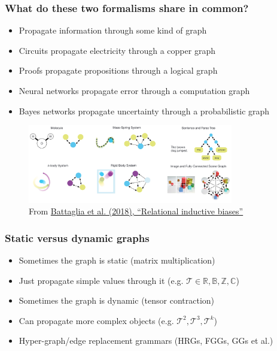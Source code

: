 \documentclass{beamer}
\begin{document}
  \begin{frame}
    \frametitle{What do these two formalisms share in common?}
    \begin{itemize}
      \item Propagate information through some kind of graph
      \item Circuits propagate electricity through a copper graph
      \item Proofs propagate propositions through a logical graph
      \item Neural networks propagate error through a computation graph
      \item Bayes networks propagate uncertainty through a probabilistic graph
    \end{itemize}
    \begin{figure}[H]
      \centering
      \includegraphics[width=0.8\textwidth]{../clipart/relational_biases.png}
      \caption{From \href{https://arxiv.org/pdf/1806.01261.pdf}{Battaglia et al. (2018), ``Relational inductive biases''}}
    \end{figure}

  \end{frame}

  \begin{frame}
    \frametitle{Static versus dynamic graphs}
    \begin{itemize}
      \item Sometimes the graph is static (matrix multiplication)
      \item Just propagate simple values through it (e.g. $\mathcal{T} \in {\mathbb{R, B, Z, C}}$)
      \item Sometimes the graph is dynamic (tensor contraction)
      \item Can propagate more complex objects (e.g. $\mathcal{T}^2, \mathcal{T}^3, \mathcal{T}^k$)
      \item Hyper-graph/edge replacement grammars (HRGs, FGGs, GGs et al.)
    \end{itemize}
  \end{frame}
\end{document}
